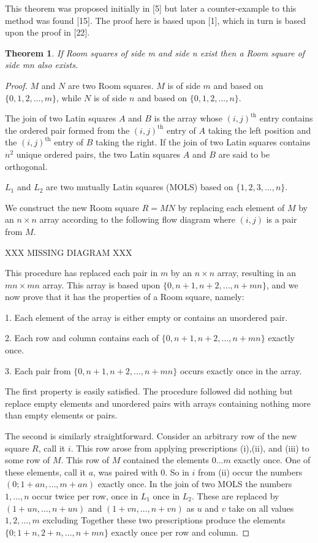 \documentclass[
  11pt,
  a4paper]{book}
\newtheorem{theorem}{Theorem}
\begin{document}
This theorem was proposed initially in {[}5{]} but later a
counter-example to this method was found {[}15{]}. The proof
here is based upon {[}1{]}, which in turn is based upon the
proof in {[}22{]}.

\begin{theorem}
If Room squares of side m and side n exist then a Room
square of side mn also exists.
\end{theorem}

\begin{proof}
$M$ and $N$ are two Room squares. $M$ is of side $m$ and
based on $\{0,1,2,...,m\}$, while $N$ is of side $n$ and
based on $\{0,1,2,...,n\}$.

The join of two Latin squares $A$ and $B$ is the array whose
$(i, j)^{\mathrm{th}}$ entry contains the ordered pair formed
from the $(i, j)^{\mathrm{th}}$ entry of $A$ taking the left
position and the $(i, j)^{\mathrm{th}}$ entry of $B$ taking
the right. If the join of two Latin squares contains $n^2$
unique ordered pairs, the two Latin squares $A$ and $B$ are
said to be orthogonal.

$L_1$ and $L_2$ are two mutually Latin squares (MOLS) based
on $\{1,2,3,...,n\}$.

We construct the new Room square $R = MN$ by replacing each
element of $M$ by an $n \times n$ array according to the
following flow diagram where $(i, j)$ is a pair from $M$.

XXX MISSING DIAGRAM XXX

This procedure has replaced each pair in $m$ by an
$n \times n$ array, resulting in an $mn \times mn$ array.
This array is based upon $\{0,n+1,n+2,...,n+mn\}$, and we
now prove that it has the properties of a Room square,
namely:

  1.  Each element of the array is either empty or contains an
      unordered pair.

  2.  Each row and column contains each of
      $\{0,n+1,n+2,...,n+mn\}$ exactly once.

  3.  Each pair from $\{0,n+1,n+2,...,n+mn\}$ occurs exactly
      once in the array.

The first property is easily satisfied. The procedure
followed did nothing but replace empty elements and
unordered pairs with arrays containing nothing more than
empty elements or pairs.

The second is similarly straightforward. Consider an
arbitrary row of the new square $R$, call it $i$. This row
arose from applying prescriptions (i),(ii), and (iii) to
some row of $M$. This row of $M$ contained the elements
$0...m$ exactly once. One of these elements, call it $a$,
was paired with 0. So in $i$ from (ii) occur the numbers
$(0;1 + an, \ldots, m + an)$ exactly once. In the join of
two MOLS the numbers $1, \ldots, n$ occur twice per row,
once in $L_1$ once in $L_2$. These are replaced by
$(1 + un, \ldots, n + un)$ and
$(1 + vn, \ldots, n + vn)$ as $u$ and $v$ take on all values
$1, 2, \ldots, m$ excluding Together these two prescriptions
produce the elements $\{0;1 + n, 2 + n, \ldots, n + mn\}$
exactly once per row and column.


\end{proof}
\end{document}
